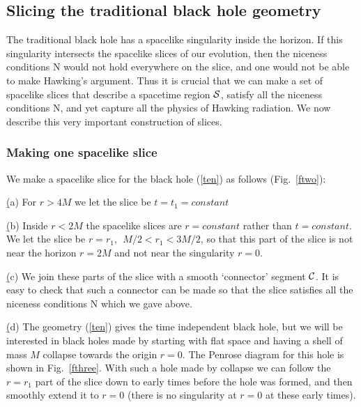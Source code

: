 \documentclass[12pt]{article}
\begin{document}
\subsection{Slicing the traditional  black hole geometry}


The traditional black hole has a spacelike singularity inside the horizon. If this singularity intersects the spacelike slices of our evolution, then the niceness conditions N would not hold everywhere on the slice, and one would not be able to make  Hawking's argument. Thus it is crucial that we can make a set of spacelike slices that describe a spacetime region ${\cal S}$, satisfy all the niceness conditions N, and yet capture all the physics of Hawking radiation. We now describe this very important construction of slices.

\subsubsection{Making one spacelike slice}

We make a spacelike slice for the black hole (\ref{ten}) as follows (Fig.~\ref{ftwo}):

\b

(a) For $r>4M$ we let the slice be $
t=t_1=constant
$

\b


(b) Inside $r<2M$ the spacelike slices are $r=constant$ rather than $t=constant$. We let the slice be
$
r=r_1, ~~{M/ 2}<r_1<{3M/ 2}
$,
so that this part of the slice is not near the horizon  $r=2M$ and not near the singularity  $r=0$.

\b


(c) We join these parts of the slice with a smooth `connector' segment ${\cal C}$. It is easy to check that such a connector can be made so that the slice satisfies all the niceness conditions N which we gave above.

\b


(d) The geometry (\ref{ten}) gives the time independent black hole, but we will be interested in black holes made by starting with flat space and having a shell of mass $M$ collapse towards the origin $r=0$. The Penrose diagram for this hole is shown in Fig.~\ref{fthree}. With such a hole made by collapse we can follow the $r=r_1$ part of the slice down to early times before the hole was formed, and then smoothly extend it to $r=0$ (there is no singularity at $r=0$ at these early times). 
\end{document}
